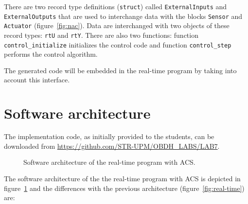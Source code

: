 There are two record type definitions ({\tt struct}) called {\tt ExternalInputs} and {\tt ExternalOutputs} that are used to interchange data with the blocks {\tt Sensor} and {\tt Actuator} (figure~\ref{fig:nac}). Data are interchanged with two objects of these record types: {\tt rtU} and {\tt rtY}. There are also two functions: function {\tt control\_initialize} initializes the control code and function {\tt control\_step} performs the control algorithm.

The generated code will be embedded in the real-time program by taking into account this interface.

\section{Software architecture}

The implementation code, as initially provided to the students, can be downloaded from \url{https://github.com/STR-UPM/OBDH\_LABS/LAB7}.

\begin{figure}[H]
            \caption{Software architecture of the real-time program with ACS.}
            \label{fig:obdh-acs}
\end{figure}

The software architecture of the the real-time program with ACS is depicted in figure~\ref{fig:obdh-acs} and the differences with the previous architecture (figure~\ref{fig:real-time}) are:

